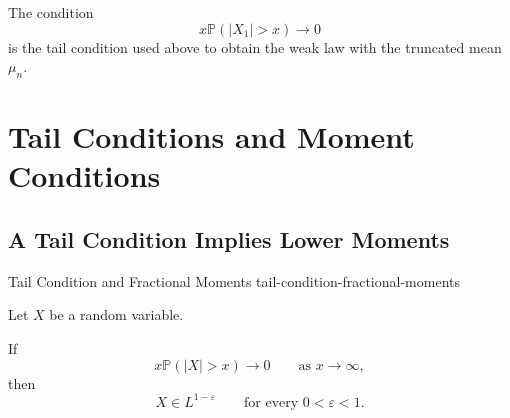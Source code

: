 \begin{remark}

The condition
\[
x\mathbb{P}(|X_1|>x)\longrightarrow0
\]
is the tail condition used above to obtain the weak law with the
truncated mean $\mu_n$.

\end{remark}



\section{Tail Conditions and Moment Conditions}

\subsection{A Tail Condition Implies Lower Moments}

\begin{theorem}{Tail Condition and Fractional Moments}
{tail-condition-fractional-moments}

Let $X$ be a random variable.

If
\[
x\mathbb{P}(|X|>x)
\longrightarrow0
\qquad
\text{as }x\to\infty,
\]
then
\[
X\in L^{1-\varepsilon}
\qquad
\text{for every }0<\varepsilon<1.
\]

\end{theorem}


